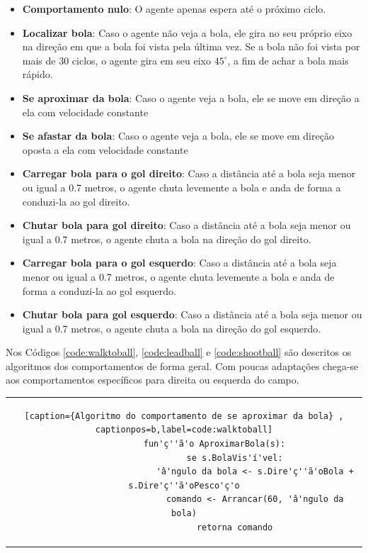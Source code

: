 \begin{itemize}
	
	\item \textbf{Comportamento nulo}: O agente apenas espera até o próximo ciclo.
	
	\item \textbf{Localizar bola}: Caso o agente não veja a bola, ele gira no seu próprio eixo na direção em que a bola foi vista pela última vez. Se a bola não foi vista por mais de 30 ciclos, o agente gira em seu eixo $45^{\circ}$, a fim de achar a bola mais rápido. 
	
	\item \textbf{Se aproximar da bola}: Caso o agente veja a bola, ele se move em direção a ela com velocidade constante
	
	\item \textbf{Se afastar da bola}: Caso o agente veja a bola, ele se move em direção oposta a ela com velocidade constante
	
	\item \textbf{Carregar bola para o gol direito}: Caso a distância até a bola seja menor ou igual a 0.7 metros, o agente chuta levemente a bola e anda de forma a conduzi-la ao gol direito.
	
	\item \textbf{Chutar bola para gol direito}: Caso a distância até a bola seja menor ou igual a 0.7 metros, o agente chuta a bola na direção do gol direito.
	
	\item \textbf{Carregar bola para o gol esquerdo}: Caso a distância até a bola seja menor ou igual a 0.7 metros, o agente chuta levemente a bola e anda de forma a conduzi-la ao gol esquerdo.
	
	\item \textbf{Chutar bola para gol esquerdo}: Caso a distância até a bola seja menor ou igual a 0.7 metros, o agente chuta a bola na direção do gol esquerdo.
	
\end{itemize}

Nos Códigos \ref{code:walktoball}, \ref{code:leadball} e \ref{code:shootball} são descritos os algoritmos dos comportamentos de forma geral. Com poucas adaptações chega-se aos comportamentos específicos para direita ou esquerda do campo.


	\begin{tabular}{c}
		\begin{lstlisting}[caption={Algoritmo do comportamento de se aproximar da bola} , captionpos=b,label=code:walktoball]
			fun'ç''ã'o AproximarBola(s):
					se s.BolaVis'í'vel:
							'â'ngulo da bola <- s.Dire'ç''ã'oBola + s.Dire'ç''ã'oPesco'ç'o
							comando <- Arrancar(60, 'â'ngulo da bola)
					retorna comando
		\end{lstlisting}
	\end{tabular}

